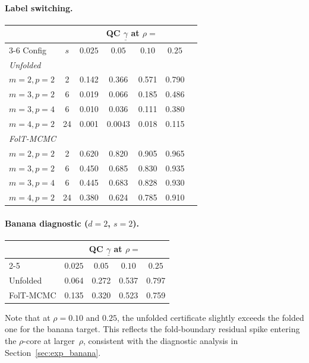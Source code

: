 \paragraph{Label switching.}

\begin{center}
\begin{tabular}{lcccccc}
\hline
& & \multicolumn{4}{c}{QC $\underline{\gamma}$ at $\rho =$} \\
\cline{3-6}
Config & $s$ & $0.025$ & $0.05$ & $0.10$ & $0.25$ \\
\hline
\multicolumn{6}{l}{\textit{Unfolded}} \\
$m{=}2, p{=}2$ & 2  & 0.142 & 0.366 & 0.571 & 0.790 \\
$m{=}3, p{=}2$ & 6  & 0.019 & 0.066 & 0.185 & 0.486 \\
$m{=}3, p{=}4$ & 6  & 0.010 & 0.036 & 0.111 & 0.380 \\
$m{=}4, p{=}2$ & 24 & 0.001 & 0.0043 & 0.018 & 0.115 \\
\hline
\multicolumn{6}{l}{\textit{FolT-MCMC}} \\
$m{=}2, p{=}2$ & 2  & 0.620 & 0.820 & 0.905 & 0.965 \\
$m{=}3, p{=}2$ & 6  & 0.450 & 0.685 & 0.830 & 0.935 \\
$m{=}3, p{=}4$ & 6  & 0.445 & 0.683 & 0.828 & 0.930 \\
$m{=}4, p{=}2$ & 24 & 0.380 & 0.624 & 0.785 & 0.910 \\
\hline
\end{tabular}
\end{center}

\paragraph{Banana diagnostic ($d = 2$, $s = 2$).}

\begin{center}
\begin{tabular}{lcccc}
\hline
& \multicolumn{4}{c}{QC $\underline{\gamma}$ at $\rho =$} \\
\cline{2-5}
& $0.025$ & $0.05$ & $0.10$ & $0.25$ \\
\hline
Unfolded  & 0.064 & 0.272 & 0.537 & 0.797 \\
FolT-MCMC & 0.135 & 0.320 & 0.523 & 0.759 \\
\hline
\end{tabular}
\end{center}

Note that at $\rho = 0.10$ and $0.25$, the unfolded certificate
slightly exceeds the folded one for the banana target.  This
reflects the fold-boundary residual spike entering the
$\rho$-core at larger~$\rho$, consistent with the diagnostic
analysis in Section~\ref{sec:exp_banana}.


